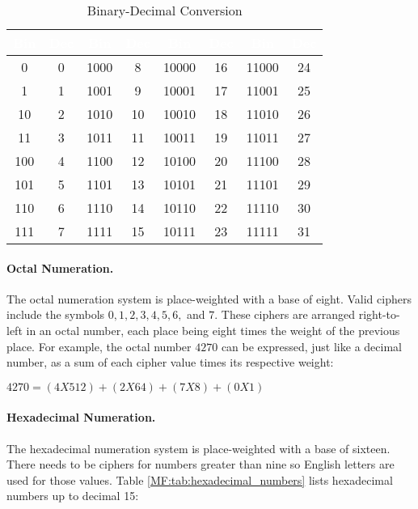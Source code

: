 \begin{table}[H]
  \sffamily
  \newcommand{\head}[1]{\textcolor{white}{\textbf{#1}}}
  \begin{center}
    \begin{tabular}{|cc|cc|cc|cc|} 
      \hline
      \rowcolor{black!75}
      \head{Bin} & \head{Dec} & \head{Bin} & \head{Dec} & \head{Bin} & 
      \head{Dec} & \head{Bin} & \head{Dec} \\
      \hline 
      0   & 0 & 1000 & 8  & 10000 & 16 & 11000 & 24 \\ 
      1   & 1 & 1001 & 9  & 10001 & 17 & 11001 & 25 \\ 
      10  & 2 & 1010 & 10 & 10010 & 18 & 11010 & 26 \\ 
      11  & 3 & 1011 & 11 & 10011 & 19 & 11011 & 27 \\ 
      100 & 4 & 1100 & 12 & 10100 & 20 & 11100 & 28 \\ 
      101 & 5 & 1101 & 13 & 10101 & 21 & 11101 & 29 \\ 
      110 & 6 & 1110 & 14 & 10110 & 22 & 11110 & 30 \\ 
      111 & 7 & 1111 & 15 & 10111 & 23 & 11111 & 31 \\ 
      \hline
    \end{tabular} 
  \end{center}
  \caption{Binary-Decimal Conversion}
  \label{MF:tab:bin_dec_conversion}
\end{table}

\paragraph{Octal Numeration.} The octal numeration system is place-weighted with a base of eight. Valid ciphers include the symbols $ 0, 1, 2, 3, 4, 5, 6, $ and $ 7 $. These ciphers are arranged right-to-left in an octal number, each place being eight times the weight of the previous place. For example, the octal number $ 4270 $ can be expressed, just like a decimal number, as a sum of each cipher value times its respective weight:

\begin{center}
  $4270 = (4 X 512) + (2 X 64) + (7 X 8) + (0 X 1)$
\end{center}

\paragraph{Hexadecimal Numeration.} The hexadecimal numeration system is place-weighted with a base of sixteen. There needs to be ciphers for numbers greater than nine so English letters are used for those values. Table \ref{MF:tab:hexadecimal_numbers} lists hexadecimal numbers up to decimal 15:

